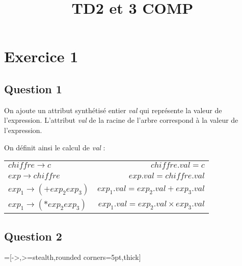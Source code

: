 \documentclass[a4paper, 11pt]{article}
\title{TD2 et 3 COMP}
\author{}
\begin{document}
	\maketitle
	
\section{Exercice 1}
	
\subsection{Question 1}
	
	On ajoute un attribut synthétisé entier \textit{val} qui représente la valeur 
	de l'expression. L'attribut \textit{val} de la racine de l'arbre correspond à 
	la valeur de l'expression.
	
	On définit ainsi le calcul de \textit{val} :
	\begin{center}
		\begin{tabular}{l | r}
			$\mathit{chiffre} \rightarrow c $&$ \mathit{chiffre.val} = c $\\
			$\mathit{exp} \rightarrow \mathit{chiffre} $&$ \mathit{exp.val} = 
			\mathit{chiffre.val}$ \\
			$\mathit{exp}_1 \rightarrow (+ \mathit{exp}_2 \mathit{exp}_3) $&$ 
			\mathit{exp}_1\mathit{.val} =	\mathit{exp}_2\mathit{.val} + 
			\mathit{exp}_3\mathit{.val}$ \\
			$\mathit{exp}_1 \rightarrow (* \mathit{exp}_2 \mathit{exp}_3) $&$ 
			\mathit{exp}_1\mathit{.val} =	\mathit{exp}_2\mathit{.val} \times 
			\mathit{exp}_3\mathit{.val}$
		\end{tabular}
	\end{center}
	
	\subsection{Question 2}
	
	=[->,>=stealth,rounded corners=5pt,thick]
	
\end{document}
